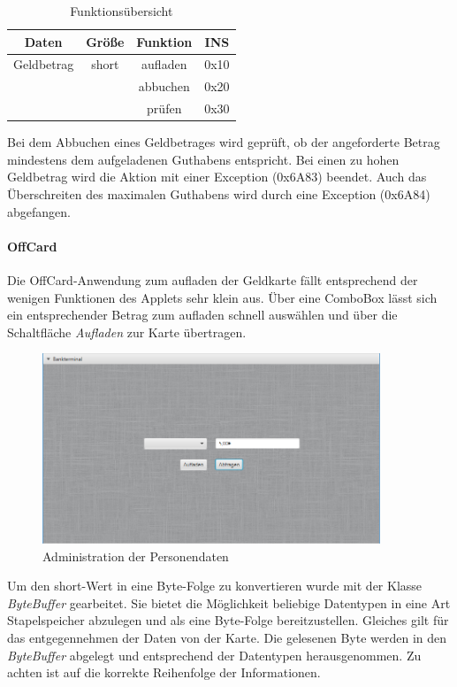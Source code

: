 \documentclass[	a4paper,
			11pt,
			oneside,
			parskip]{scrartcl}
\begin{document}
\begin{table}[H]
  \centering
  \caption{Funktionsübersicht}
    \begin{tabular}{crcc}
    \toprule
    \textbf{Daten} & \multicolumn{1}{c}{\textbf{Größe}} & \textbf{Funktion} & \textbf{INS} \\
    \midrule
    Geldbetrag & \multicolumn{1}{c}{short} & aufladen & 0x10 \\
          & \multicolumn{1}{c}{} & abbuchen & 0x20 \\
          & \multicolumn{1}{c}{} & prüfen & 0x30 \\
    \bottomrule
    \end{tabular}%
  \label{tab:walletdata}%
\end{table}%

Bei dem Abbuchen eines Geldbetrages wird geprüft, ob der angeforderte Betrag mindestens dem aufgeladenen Guthabens entspricht. Bei einen zu hohen Geldbetrag wird die Aktion mit einer Exception (0x6A83) beendet. Auch das Überschreiten des maximalen Guthabens wird durch eine Exception (0x6A84) abgefangen.

\paragraph{OffCard} Die OffCard-Anwendung zum aufladen der Geldkarte fällt entsprechend der wenigen Funktionen des Applets sehr klein aus. Über eine ComboBox lässt sich ein entsprechender Betrag zum aufladen schnell auswählen und über die Schaltfläche \textit{Aufladen} zur Karte übertragen. 

\begin{figure}[H]
	\centering
  	\includegraphics[width=0.9\textwidth]{img/wallet}
	\caption{Administration der Personendaten}
	\label{walletoff}
\end{figure}

Um den short-Wert in eine Byte-Folge zu konvertieren wurde mit der Klasse \textit{ByteBuffer} gearbeitet. Sie bietet die Möglichkeit beliebige Datentypen in eine Art Stapelspeicher abzulegen und als eine Byte-Folge bereitzustellen. Gleiches gilt für das entgegennehmen der Daten von der Karte. Die gelesenen Byte werden in den \textit{ByteBuffer} abgelegt und entsprechend der Datentypen herausgenommen. Zu achten ist auf die korrekte Reihenfolge der Informationen.
\end{document}
